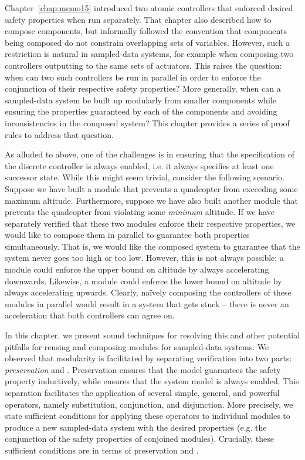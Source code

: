 Chapter~\ref{chap:memo15} introduced two atomic controllers that enforced
desired safety properties when run separately. That chapter also described
how to compose components, but informally followed the convention that
components being composed do not constrain overlapping sets of
variables. However, such a restriction is natural in sampled-data systems,
for example when composing two controllers outputting to the same sets of
actuators. This raises the question: when can two such controllers be run
in parallel in order to enforce the conjunction of their respective safety
properties? More generally, when can a sampled-data system be built up
modularly from smaller components while ensuring the properties guaranteed
by each of the components and avoiding inconsistencies in the composed
system? This chapter provides a series of proof rules to address that
question.

As alluded to above, one of the challenges is in ensuring that the
specification of the discrete controller is always enabled, i.e. it always
specifies at least one successor state.  While this might seem trivial,
consider the following scenario.  Suppose we have built a module that
prevents a quadcopter from exceeding some maximum altitude.  Furthermore,
suppose we have also built another module that prevents the quadcopter from
violating some \emph{minimum} altitude.  If we have separately verified
that these two modules enforce their respective properties, we would like
to compose them in parallel to guarantee both properties simultaneously.
That is, we would like the composed system to guarantee that the system
never goes too high or too low.  However, this is not always possible; a
module could enforce the upper bound on altitude by always accelerating
downwards.  Likewise, a module could enforce the lower bound on altitude by
always accelerating upwards.  Clearly, na\"ively composing the controllers
of these modules in parallel would result in a system that gets stuck --
there is never an acceleration that both controllers can agree on.

In this chapter, we present sound techniques for resolving this and other
potential pitfalls for reusing and composing modules for sampled-data
systems.  We observed that modularity is facilitated by separating
verification into two parts: \emph{preservation} and \emph{\progress{}}.
Preservation ensures that the model guarantees the safety property
inductively, while \progress{} ensures that the system model is always
enabled.  This separation facilitates the application of several simple,
general, and powerful operators, namely substitution, conjunction, and
disjunction.  More precisely, we state sufficient conditions for applying
these operators to individual modules to produce a new sampled-data system
with the desired properties (e.g. the conjunction of the safety properties
of conjoined modules).  Crucially, these sufficient conditions are in terms
of preservation and \progress{}.

